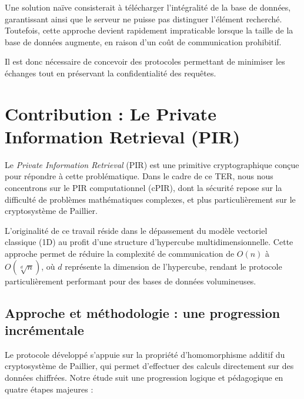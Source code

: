 \documentclass[12pt,a4paper]{report}
\begin{document}
Une solution naïve consisterait à télécharger l’intégralité de la base de données, garantissant ainsi que le serveur ne puisse pas distinguer l’élément recherché. Toutefois, cette approche devient rapidement impraticable lorsque la taille de la base de données augmente, en raison d’un coût de communication prohibitif.

Il est donc nécessaire de concevoir des protocoles permettant de minimiser les échanges tout en préservant la confidentialité des requêtes.




\section{Contribution : Le Private Information Retrieval (PIR)}
Le \textit{Private Information Retrieval} (PIR) est une primitive cryptographique conçue pour répondre à cette problématique. Dans le cadre de ce TER, nous nous concentrons sur le PIR computationnel (cPIR), dont la sécurité repose sur la difficulté de problèmes mathématiques complexes, et plus particulièrement sur le cryptosystème de Paillier.

L'originalité de ce travail réside dans le dépassement du modèle vectoriel classique (1D) au profit d'une structure d'hypercube multidimensionnelle. Cette approche permet de réduire la complexité de communication de $O(n)$ à $O(\sqrt[d]{n})$, où $d$ représente la dimension de l'hypercube, rendant le protocole particulièrement performant pour des bases de données volumineuses.

\subsection{Approche et méthodologie : une progression incrémentale}
Le protocole développé s'appuie sur la propriété d'homomorphisme additif du cryptosystème de Paillier, qui permet d'effectuer des calculs directement sur des données chiffrées. Notre étude suit une progression logique et pédagogique en quatre étapes majeures :
\end{document}
